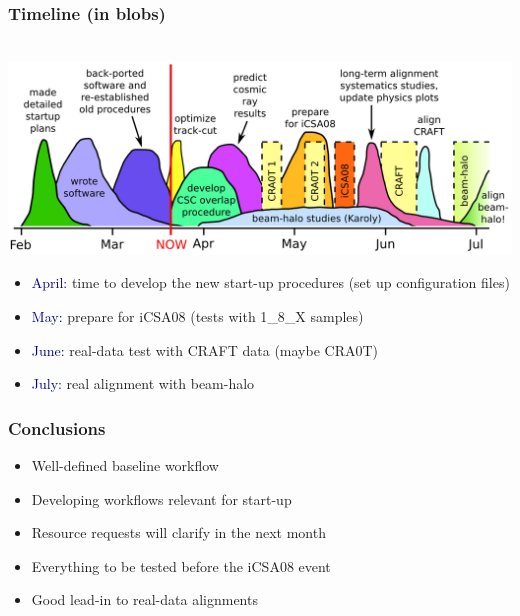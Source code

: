 \documentclass[compress]{beamer}
\begin{document}
\begin{frame}
\frametitle{Timeline (in blobs)}
\mbox{\hspace{-0.75 cm} \includegraphics[width=1.12\linewidth]{plan.png}}

\begin{itemize}
\item \textcolor{darkblue}{April:} time to develop the new start-up procedures (set up configuration files)

\item \textcolor{darkblue}{May:} prepare for iCSA08 (tests with 1\_8\_X samples)

\item \textcolor{darkblue}{June:} real-data test with CRAFT data (maybe CRA0T)

\item \textcolor{darkblue}{July:} real alignment with beam-halo
\end{itemize}
\end{frame}


\begin{frame}
\frametitle{Conclusions}

\Large
\begin{itemize}\setlength{\itemsep}{0.5 cm}
\item Well-defined baseline workflow
\item Developing workflows relevant for start-up
\item Resource requests will clarify in the next month
\item Everything to be tested before the iCSA08 event
\item Good lead-in to real-data alignments
\end{itemize}

\label{numpages}
\end{frame}
\end{document}
